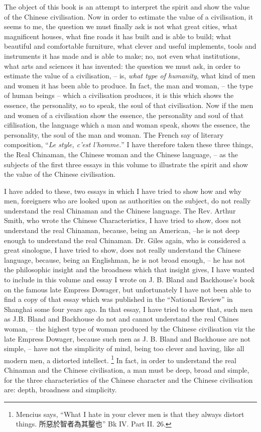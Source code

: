 
The object of this book is an attempt to interpret the spirit and show the value of the Chinese civilisation.
Now in order to estimate the value of a civilisation, it seems to me, the question we must finally ask is not what great cities, what magnificent houses, what fine roads it has built and is able to build;
what beautiful and comfortable furniture,
what clever and useful implements, tools and instruments it has made and is able to make;
no, not even what institutions, what arts and sciences it has invented:
the question we must ask, in order to estimate the value of a civilisation,
-- is, \emph{what type of humanity},
what kind of men and women it has been able to produce.
In fact, the man and woman,
-- the type of human beings
-- which a civilisation produces,
it is this which shows the essence, the personality,
so to speak, the soul of that civilisation.
Now if the men and women of a civilisation show the essence,
the personality and soul of that cifilisation, the language which a man and woman speak, shows the essence, the personality, the soul of the man and woman.
The French say of literary composition, ``\emph{Le style, c'est l'homme.}''
I have therefore taken these three things, the Real Chinaman, the Chinese woman and the Chinese language,
-- as the subjects of the first three essays in this volume to illustrate the spirit
and show the value of the Chinese civilisation.

I have added to these, two essays in which I have tried to show how and why men, foreigners who are looked upon as authorities on the subject, do not really understand the real Chinaman and the Chinese language. The Rev. Arthur Smith, who wrote the Chinese Characteristics, I have tried to show, does not understand the real Chinaman, because, being an American, --he is not deep enough to understand the real Chinaman. Dr. Giles again, who is considered a great sinologue,
I have tried to show, does not really understand the Chinese language, because, being an Englishman, he is not broad enough, -- he has not the philosophic insight and the broadness which that insight gives, I have wanted to include in this volume and essay I wrote on J. B. Bland and Backhouse's book on the famous late Empress Dowager, but unfortunately I have not been able to find a copy of that essay which was published in the ``National Review'' in Shanghai some four years ago.
In that essay, I have tried to show that, such men as J.B. Bland and Backhouse do not and cannot understand the real Chines woman, -- the highest type of woman produced by the Chinese civilisation viz the late Empress Dowager, because such men as J. B. Bland and Backhouse are not simple, -- have not the simplicity of mind, being too clever and having, like all modern men,
a distorted intellect. \footnote{Mencius says, ``What I hate in your clever men is that they always distort things. 所惡於智者為其鑿也'' Bk IV. Part II. 26.}
In fact, in order to understand the real Chinaman and the Chinese civilisation, a man must be deep, broad and simple, for the three characteristics of the Chinese character and the Chinese civilisation are: depth, broadness and simplicity.

